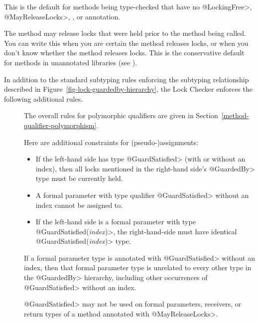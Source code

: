 \begin{sloppypar}
\begin{description}
  This is the default for methods being type-checked that have no \<@LockingFree>,
  \<@MayReleaseLocks>, , or 
  annotation.

\item[\refqualclass{checker/lock/qual}{MayReleaseLocks}]
  The method may release locks that were held prior to the method being called.
  You can write this when you are certain the method releases locks, or
  when you don't know whether the method releases locks.
  This is the conservative default for methods in unannotated libraries (see ).

\end{description}
\end{sloppypar}



In addition to the standard subtyping rules enforcing the subtyping relationship
described in Figure~\ref{fig-lock-guardedby-hierarchy}, the Lock Checker enforces
the following additional rules.



\begin{description}

\item[]

  The overall rules for polymorphic qualifiers are given in
  Section~\ref{method-qualifier-polymorphism}.

  Here are additional constraints for (pseudo-)assignments:

  \begin{itemize}
  \item
    If the left-hand side has type \<@GuardSatisfied> (with or without an index),
    then all locks mentioned in the right-hand side's \<@GuardedBy> type
    must be currently held.
  \item
    A formal parameter with type qualifier \<@GuardSatisfied> without an
    index cannot be assigned to.
  \item
    If the left-hand side is a formal parameter with type
    \<@GuardSatisfied(\emph{index})>, the right-hand-side must have
    identical \<@GuardSatisfied(\emph{index})> type.
  \end{itemize}

  If a formal parameter type is
  annotated with \<@GuardSatisfied> without an index, then that formal parameter
  type is unrelated to every other type in the \<@GuardedBy> hierarchy,
  including other occurrences of \<@GuardSatisfied> without an index.

  \<@GuardSatisfied> may not be used on formal parameters, receivers, or
  return types of a method annotated with \<@MayReleaseLocks>.
\end{description}

